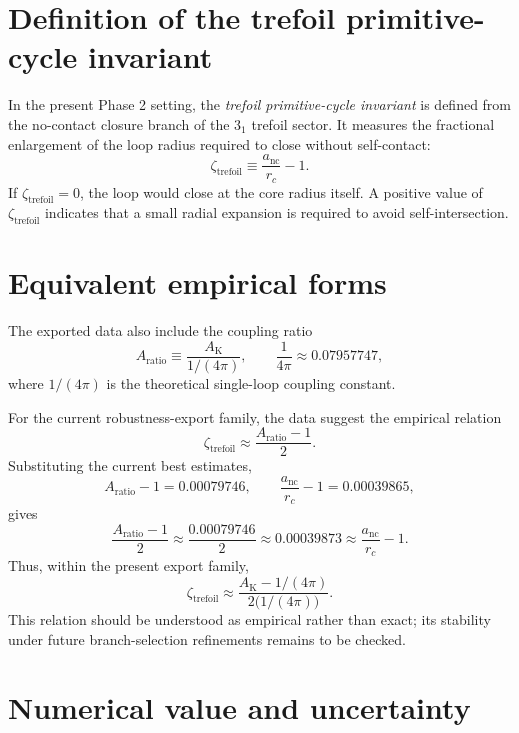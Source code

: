 \documentclass[11pt]{article}
\newcommand{\AK}{A_{\mathrm{K}}}
\newcommand{\Aratio}{A_{\mathrm{ratio}}}
\newcommand{\anc}{a_{\mathrm{nc}}}
\newcommand{\rc}{r_{\!c}}
\newcommand{\zetatrefoil}{\zeta_{\mathrm{trefoil}}}
\begin{document}
\section{Definition of the trefoil primitive-cycle invariant}

In the present Phase 2 setting, the \emph{trefoil primitive-cycle invariant} is defined from the no-contact closure branch of the \(3_1\) trefoil sector. It measures the fractional enlargement of the loop radius required to close without self-contact:
\begin{equation}
    \zetatrefoil \equiv \frac{\anc}{\rc}-1.
    \label{eq:zeta-def}
\end{equation}
If \(\zetatrefoil=0\), the loop would close at the core radius itself. A positive value of \(\zetatrefoil\) indicates that a small radial expansion is required to avoid self-intersection.

\section{Equivalent empirical forms}

The exported data also include the coupling ratio
\begin{equation}
    \Aratio \equiv \frac{\AK}{1/(4\pi)},
    \qquad
    \frac{1}{4\pi}\approx \num{0.07957747},
\end{equation}
where \(1/(4\pi)\) is the theoretical single-loop coupling constant.

For the current robustness-export family, the data suggest the empirical relation
\begin{equation}
    \zetatrefoil \approx \frac{\Aratio-1}{2}.
    \label{eq:zeta-from-Aratio}
\end{equation}
Substituting the current best estimates,
\[
\Aratio-1 = \num{0.00079746},
\qquad
\frac{\anc}{\rc}-1=\num{0.00039865},
\]
gives
\[
\frac{\Aratio-1}{2}
\approx
\frac{\num{0.00079746}}{2}
\approx
\num{0.00039873}
\approx
\frac{\anc}{\rc}-1.
\]
Thus, within the present export family,
\begin{equation}
    \zetatrefoil \approx \frac{\AK-1/(4\pi)}{2\bigl(1/(4\pi)\bigr)}.
\end{equation}
This relation should be understood as empirical rather than exact; its stability under future branch-selection refinements remains to be checked.

\section{Numerical value and uncertainty}
\end{document}
